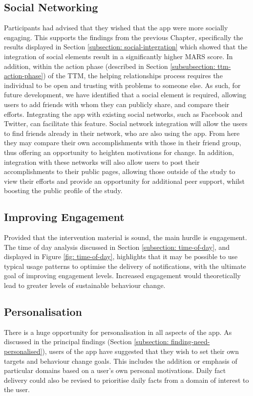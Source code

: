 \subsection{Social Networking}
Participants had advised that they wished that the app were more socially engaging. This supports the findings from the previous Chapter, specifically the results displayed in Section \ref{subsection: social-integration} which showed that the integration of social elements result in a significantly higher MARS
score.
In addition, within the action phase (described in Section \ref{subsubsection: ttm-action-phase}) of the TTM, the helping relationships process requires the individual to be open and trusting with problems to someone else. As such, for future development, we have identified that a social element is required, allowing users to add friends with whom they can publicly share, and compare their efforts. Integrating the app with existing social networks, such as Facebook and Twitter, can facilitate this feature. Social network integration will allow the users to find friends already in their network, who are also using the app. From here they may compare their own accomplishments with those in their friend group, thus offering an opportunity to heighten motivations for change. In addition, integration with these networks will also allow users to post their accomplishments to their public pages, allowing those outside of the study to view their efforts and provide an opportunity for additional peer support, whilst boosting the public profile of the study.

\subsection{Improving Engagement}
Provided that the intervention material is sound, the main hurdle is engagement. The time of day analysis discussed in Section \ref{subsection: time-of-day}, and displayed in Figure \ref{fig: time-of-day}, highlights that it may be possible to use typical usage patterns to optimise the delivery of notifications, with the ultimate goal of improving engagement levels. Increased engagement would theoretically lead to greater levels of sustainable behaviour change.

\subsection{Personalisation} \label{subsection: gm-future-personalisation}
There is a huge opportunity for personalisation in all aspects of the app. As discussed in the principal findings (Section \ref{subsection: finding-need-personalised}), users of the app have suggested that they wish to set their own targets and behaviour change goals. This includes the addition or emphasis of particular domains based on a user’s own personal motivations. Daily fact delivery could also be revised to prioritise daily facts from a domain of interest to the user.

